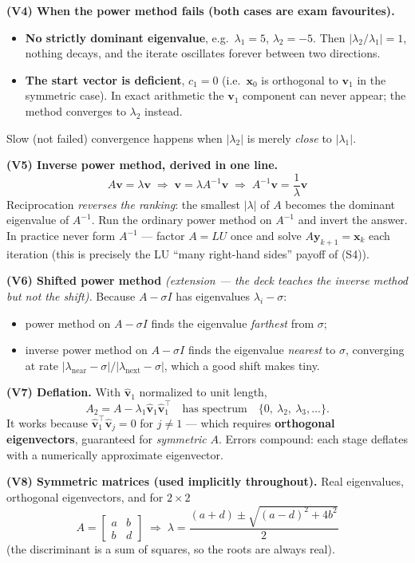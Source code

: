 \begin{derivedbox}
\smallskip
\textbf{(V4) When the power method fails (both cases are exam favourites).}
\begin{itemize}
\item \textbf{No strictly dominant eigenvalue}, e.g.\ $\lambda_1 = 5$, $\lambda_2 = -5$. Then $|\lambda_2/\lambda_1| = 1$, nothing decays, and the iterate oscillates forever between two directions.
\item \textbf{The start vector is deficient}, $c_1 = 0$ (i.e.\ $\mathbf x_0$ is orthogonal to $\mathbf v_1$ in the symmetric case). In exact arithmetic the $\mathbf v_1$ component can never appear; the method converges to $\lambda_2$ instead.
\end{itemize}
Slow (not failed) convergence happens when $|\lambda_2|$ is merely \emph{close} to $|\lambda_1|$.

\smallskip
\textbf{(V5) Inverse power method, derived in one line.}
\[
A\mathbf v = \lambda\mathbf v \;\Longrightarrow\; \mathbf v = \lambda A^{-1}\mathbf v \;\Longrightarrow\; A^{-1}\mathbf v = \frac{1}{\lambda}\mathbf v
\]
Reciprocation \emph{reverses the ranking}: the smallest $|\lambda|$ of $A$ becomes the dominant eigenvalue of $A^{-1}$. Run the ordinary power method on $A^{-1}$ and invert the answer. In practice never form $A^{-1}$ --- factor $A = LU$ once and solve $A\mathbf y_{k+1} = \mathbf x_k$ each iteration (this is precisely the LU ``many right-hand sides'' payoff of (S4)).

\smallskip
\textbf{(V6) Shifted power method} \emph{(extension --- the deck teaches the inverse method but not the shift).} Because $A - \sigma I$ has eigenvalues $\lambda_i - \sigma$:
\begin{itemize}
\item power method on $A-\sigma I$ finds the eigenvalue \emph{farthest} from $\sigma$;
\item inverse power method on $A-\sigma I$ finds the eigenvalue \emph{nearest} to $\sigma$, converging at rate $|\lambda_{\text{near}}-\sigma| / |\lambda_{\text{next}}-\sigma|$, which a good shift makes tiny.
\end{itemize}

\smallskip
\textbf{(V7) Deflation.} With $\hat{\mathbf v}_1$ normalized to unit length,
\[
A_2 = A - \lambda_1\hat{\mathbf v}_1\hat{\mathbf v}_1^{\top}
\quad\text{has spectrum}\quad \{0,\ \lambda_2,\ \lambda_3,\dots\}.
\]
It works because $\hat{\mathbf v}_1^{\top}\hat{\mathbf v}_j = 0$ for $j\neq1$ --- which requires \textbf{orthogonal eigenvectors}, guaranteed for \emph{symmetric} $A$. Errors compound: each stage deflates with a numerically approximate eigenvector.

\smallskip
\textbf{(V8) Symmetric matrices (used implicitly throughout).} Real eigenvalues, orthogonal eigenvectors, and for $2\times2$
\[
A = \begin{bmatrix}a&b\\b&d\end{bmatrix}
\;\Longrightarrow\;
\lambda = \frac{(a+d) \pm \sqrt{(a-d)^2 + 4b^2}}{2}
\]
(the discriminant is a sum of squares, so the roots are always real).
\end{derivedbox}

